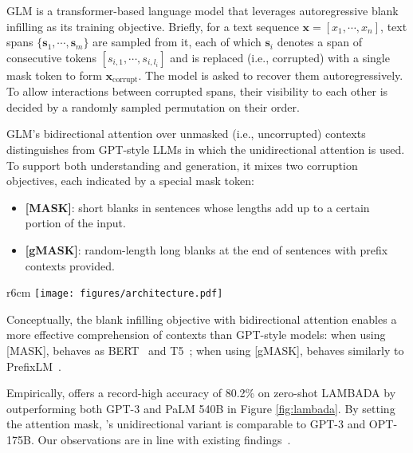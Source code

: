 GLM is a transformer-based language model that leverages autoregressive blank infilling as its training objective.
Briefly, for a text sequence $\boldsymbol{x}=[x_1,\cdots,x_n]$, text spans $\{\boldsymbol{s}_1,\cdots,\boldsymbol{s}_m\}$ are sampled from it, each of which $\boldsymbol{s}_i$ denotes a span of consecutive tokens $[s_{i,1},\cdots,s_{i,l_i}]$ and is replaced (i.e., corrupted) with a single mask token to form $\boldsymbol{x}_{\text{corrupt}}$. 
The model is asked to recover them autoregressively.
To allow interactions between corrupted spans, their visibility to each other is decided by a randomly sampled permutation on their order. 

GLM's bidirectional attention over unmasked (i.e., uncorrupted) contexts distinguishes \glm from GPT-style LLMs in which the unidirectional attention is used. 
To support both understanding and generation, it mixes two corruption objectives, each indicated by a special mask token:
\begin{itemize}[leftmargin=*,itemsep=0pt,parsep=0.2em,topsep=0.0em,partopsep=0.0em]
    \item \textbf{[MASK]}: short blanks in sentences whose lengths add up to a certain portion of the input.
    \item \textbf{[gMASK]}: random-length long blanks at the end of sentences with prefix contexts provided.
\end{itemize}

\begin{wrapfigure}{r}{6cm}
    \small
    \vspace{-6mm}
    \centering
    \texttt{[image: figures/architecture.pdf]}
    \vspace{-6mm}
    \caption{\glm and LLMs of similar scale on zero-shot LAMBADA language modeling. 
    Details on GLM's bidirectional attention are provided in \citet{du2022glm}.}
    \label{fig:lambada}
    \vspace{-8mm}
\end{wrapfigure}

Conceptually, the blank infilling objective with bidirectional attention enables a more effective comprehension of contexts than GPT-style models: 
when using [MASK], \glm behaves as BERT~\citep{devlin2019bert} and T5~\citep{raffel2020exploring}; 
when using [gMASK], \glm behaves similarly to PrefixLM~\citep{liu2018generating,dong2019unified}.

Empirically, 
\glm %
offers a record-high accuracy of 80.2\% on zero-shot LAMBADA  by outperforming both GPT-3 and PaLM 540B in Figure \ref{fig:lambada}. 
By setting the attention mask, \glm's  unidirectional variant is comparable to GPT-3 and OPT-175B. 
Our observations are in line with existing findings~\citep{liu2018generating,dong2019unified}. 

